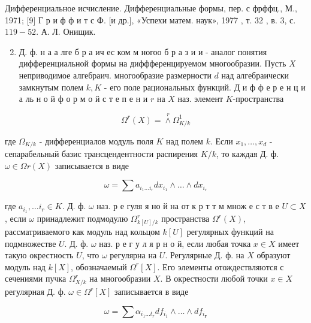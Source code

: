 \documentclass[10pt]{article}
\begin{document}
Дифференциальное исчисление. Дифференциальные формы, пер. с фрффц., М., 1971; [9] Г р и ф ф и т с Ф. [и др.], «Успехи матем. наук», 1977 , т. 32 , в. 3, с. $119-52$. А. Л. Онищик.



\begin{enumerate}

  \setcounter{enumi}{1}

  \item Д. ф. н а а лге б р а ич ес ком м ногоо б р а з и и - аналог понятия дифференциальной формы на диффференцируемом многообразии. Пусть $X$ неприводимое алгебраич. многообразие размерности $d$ над алгебраически замкнутым полем $k, K$ - его поле рациональных функций. Д и ф ф е р е н ц и а ль н о й ф о р м о й с т е п е н и $r$ на $X$ наз. элемент $K$-пространства

\end{enumerate}



\[

\Omega^{r}(X)=\stackrel{r}{\wedge} \Omega_{K / k}^{1}

\]



где $\Omega_{K / k}$ - дифференциалов модуль поля $K$ над полем $k$. Если $x_{1}, \ldots, x_{d}$ - сепарабельный базис трансцендентности распирения $K / k$, то каждая Д. ф. $\omega \in \Omega r(X)$ записывается в виде



\[

\omega=\sum a_{i_{1} \ldots i_{r}} d x_{i_{1}} \wedge \ldots \wedge d x_{i_{r}}

\]



где $a_{i_{1}}, \ldots i_{r} \in K$. Д. ф. $\omega$ наз. р е гуля я но й на от к р т т м множ е с т в е $U \subset X$, если $\omega$ принадлежит подмодулю $\Omega_{k[U] / k}^{r}$ пространства $\Omega^{r}(X)$, рассматриваемого как модуль над кольцом $k[U]$ регулярных функций на подмножестве $U$. Д. ф. $\omega$ наз. р е г у л я р н о й, если любая точка $x \in X$ имеет такую окрестность $U$, что $\omega$ регулярна на $U$. Регулярные Д. ф. на $X$ образуют модуль над $k[X]$, обозначаемый $\Omega^{r}[X]$. Его элементы отождествляются с сечениями пучка $\Omega_{X / k}^{r}$ на многообразии $X$. В окрестности любой точки $x \in X$ регулярная Д. ф. $\omega \in \Omega^{r}[X]$ записывается в виде



\[

\omega=\sum \alpha_{i_{1} \ldots t_{r}} d f_{i_{1}} \wedge \ldots \wedge d f_{i_{\boldsymbol{r}}}

\]
\end{document}
